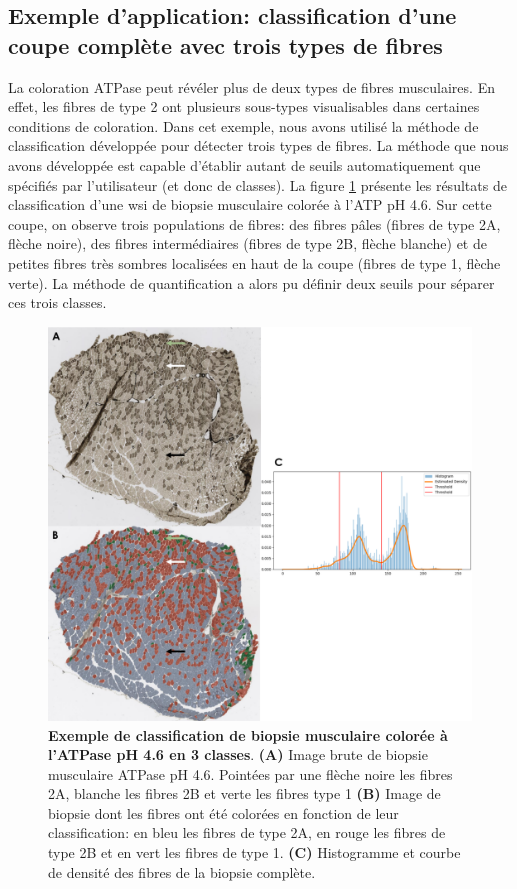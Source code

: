 \subsection{Exemple d'application: classification d'une coupe complète avec trois types de fibres}
La coloration ATPase peut révéler plus de deux types de fibres musculaires. En effet, les fibres de type 2 ont plusieurs sous-types visualisables dans certaines conditions de coloration. Dans cet exemple, nous avons utilisé la méthode de classification développée pour détecter trois types de fibres. La méthode que nous avons développée est capable d'établir autant de seuils automatiquement que spécifiés par l'utilisateur (et donc de classes). La figure \ref{fig:atp_paint_wsi} présente les résultats de classification d'une \gls{wsi} de biopsie musculaire colorée à l'ATP pH 4.6. Sur cette coupe, on observe trois populations de fibres: des fibres pâles (fibres de type 2A, flèche noire), des fibres intermédiaires (fibres de type 2B, flèche blanche) et de petites fibres très sombres localisées en haut de la coupe (fibres de type 1, flèche verte). La méthode de quantification a alors pu définir deux seuils pour séparer ces trois classes. 
\begin{figure}[!ht]
 \centering
 \includegraphics[width=1\textwidth]{figures/atp_wsi.png}
 \caption[Exemple de classification de biopsie musculaire colorée à l'ATPase]{\textbf{Exemple de classification de biopsie musculaire colorée à l'ATPase pH 4.6 en 3 classes}. \textbf{(A)} Image brute de biopsie musculaire ATPase pH 4.6. Pointées par une flèche noire les fibres 2A, blanche les fibres 2B et verte les fibres type 1 \textbf{(B)} Image de biopsie dont les fibres ont été colorées en fonction de leur classification: en bleu les fibres de type 2A, en rouge les fibres de type 2B et en vert les fibres de type 1. \textbf{(C)} Histogramme et courbe de densité des fibres de la biopsie complète.}
 \label{fig:atp_paint_wsi}
\end{figure}

